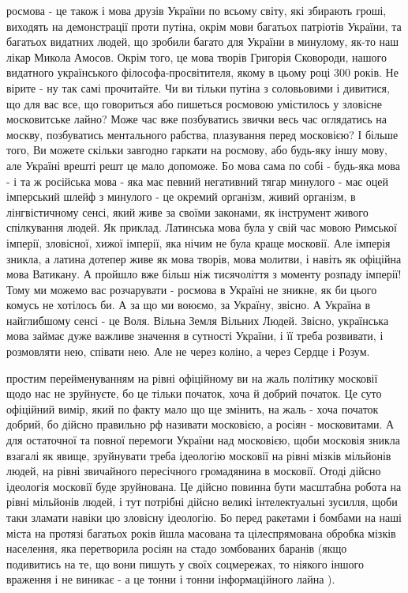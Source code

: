 росмова - це також і мова друзів України по всьому світу, які збирають гроші,
виходять на демонстрації проти путіна, окрім мови багатьох патріотів України,
та багатьох видатних людей, що зробили багато для України в минулому, як-то наш
лікар Микола Амосов. Окрім того, це мова творів Григорія Сковороди, нашого
видатного українського філософа-просвітителя, якому в цьому році 300 років. Не
вірите - ну так самі прочитайте. Чи ви тільки путіна з соловьовими і дивитися,
що для вас все, що говориться або пишеться росмовою умістилось у зловісне
московитське лайно? Може час вже позбуватись звички весь час оглядатись на
москву, позбуватись ментального рабства, плазування перед московією? І більше
того, Ви можете скільки завгодно гаркати на росмову, або будь-яку іншу мову,
але Україні врешті решт це мало допоможе. Бо мова сама по собі - будь-яка мова
- і та ж російська мова - яка має певний негативний тягар минулого - має оцей
імперський шлейф з минулого  - це окремий організм, живий організм, в
лінгвістичному сенсі, який живе за своїми законами, як інструмент живого
спілкування людей. Як приклад. Латинська мова була у свій час мовою Римської
імперії, зловісної, хижої імперії, яка нічим не була краще московії. Але
імперія зникла, а латина дотепер живе як мова творів, мова молитви, і навіть як
офіційна мова Ватикану.  А пройшло вже більш ніж тисячоліття з моменту розпаду
імперії! Тому ми можемо вас розчарувати - росмова в Україні не зникне, як би
цього комусь не хотілось би. А за що ми воюємо, за Україну, звісно. А Україна в
найглибшому сенсі - це Воля. Вільна Земля Вільних Людей. Звісно, українська
мова займає дуже важливе значення в сутності України, і її треба розвивати, і
розмовляти нею, співати нею. Але не через коліно, а через Сердце і Розум. 

простим перейменуванням на рівні офіційному ви на жаль політику московії щодо
нас не зруйнуєте, бо це тільки початок, хоча й добрий початок. Це суто
офіційний вимір, який по факту мало що ще змінить, на жаль - хоча початок
добрий, бо дійсно правильно рф називати московією, а росіян - московитами.  А
для остаточної та повної перемоги України над московією, щоби московія зникла
взагалі як явище, зруйнувати треба ідеологію московії на рівні мізків мільйонів
людей, на рівні звичайного пересічного громадянина в московії. Отоді дійсно
ідеологія московії буде зруйнована. Це дійсно повинна бути масштабна робота на
рівні мільйонів людей, і тут потрібні дійсно великі інтелектуальні зусилля,
щоби таки зламати навіки цю зловісну ідеологію.  Бо перед ракетами і бомбами на
наші міста на протязі багатьох років йшла масована та цілеспрямована обробка
мізків населення, яка перетворила росіян на стадо зомбованих баранів (якщо
подивитись на те, що вони пишуть у своїх соцмережах, то ніякого іншого враження
і не виникає - а це тонни і тонни інформаційного лайна ).

